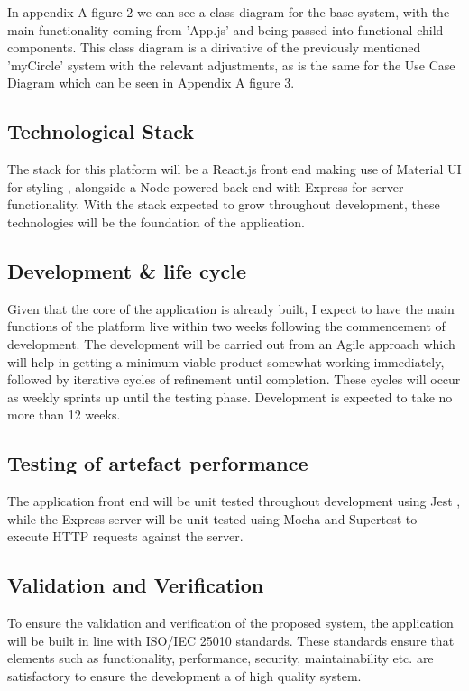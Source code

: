 \documentclass[lettersize,journal]{IEEEtran}
\begin{document}
	In appendix A figure 2 we can see a class diagram for the base system, with the main functionality coming from 'App.js' and being passed into
	functional child components. This class diagram is a dirivative of the previously mentioned 'myCircle' system with the relevant adjustments,
	as is the same for the Use Case Diagram which can be seen in Appendix A figure 3.

	\subsection{Technological Stack}
	The stack for this platform will be a React.js front end \cite{React} making use of Material UI for
    styling \cite{Mui}, alongside a Node powered back end \cite{Node} with Express for server
    functionality\cite{Express}. With the stack expected to grow throughout development, these technologies will be the foundation of the application.

	\subsection{Development \& life cycle}
		Given that the core of the application is already built, I expect to have the main functions of the platform live within two weeks following
		the commencement
		of development. The development will be carried out from an Agile approach \cite{Agile} which will help in getting a minimum viable product somewhat working 
		immediately, followed by iterative cycles of refinement until completion. These cycles will occur as weekly sprints up until the testing phase.
		Development is expected to take no more than 12 weeks.

	\subsection{Testing of artefact performance}
	The application front end will be unit tested throughout development using Jest \cite{Jest}, while the Express server will be unit-tested using Mocha \cite{Mocha}
	and Supertest \cite{SuperTest} to execute HTTP requests against the server.

	\subsection{Validation and Verification}
	
	To ensure the validation and verification of the proposed system, the application will be built in line with ISO/IEC 25010 \cite{ISO25000} standards.
	These standards ensure that elements such as functionality, performance, security, maintainability etc. are satisfactory to ensure the development a
	of high quality system.
\end{document}
